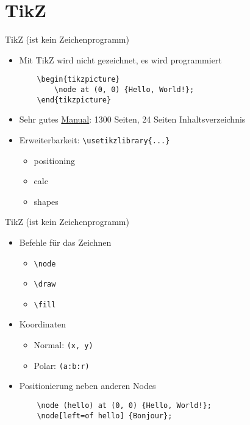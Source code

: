 \documentclass[main.tex]{subfiles}
\begin{document}
\section{TikZ}

\begin{frame}[fragile]{TikZ (ist kein Zeichenprogramm)}
    \begin{itemize}
        \item Mit TikZ wird nicht gezeichnet, es wird programmiert
        \pause
        \begin{verbatim}
    \begin{tikzpicture}
        \node at (0, 0) {Hello, World!};
    \end{tikzpicture}
        \end{verbatim}
        \vspace{-12pt}
        \pause
        \item Sehr gutes \href{https://ctan.mc1.root.project-creative.net/graphics/pgf/base/doc/pgfmanual.pdf}{Manual}: 1300 Seiten, 24 Seiten Inhaltsverzeichnis
        \medskip
        \pause
        \item Erweiterbarkeit: \verb|\usetikzlibrary{...}|
        \begin{itemize}
            \item positioning
            \item calc
            \item shapes
        \end{itemize}
    \end{itemize}
\end{frame}

\begin{frame}[fragile]{TikZ (ist kein Zeichenprogramm)}
    \begin{itemize}
        \item Befehle für das Zeichnen
        \pause
        \begin{itemize}
            \item \verb|\node|
            \item \verb|\draw|
            \item \verb|\fill|
        \end{itemize}
        \pause
        \medskip
        \item Koordinaten
        \begin{itemize}
            \item Normal: \texttt{(x, y)}
            \item Polar: \texttt{(a:b:r)}
        \end{itemize}
        \pause
        \medskip
        \item Positionierung neben anderen Nodes
        \begin{verbatim}
    \node (hello) at (0, 0) {Hello, World!};
    \node[left=of hello] {Bonjour};
        \end{verbatim}
    \end{itemize}
\end{frame}
\end{document}
